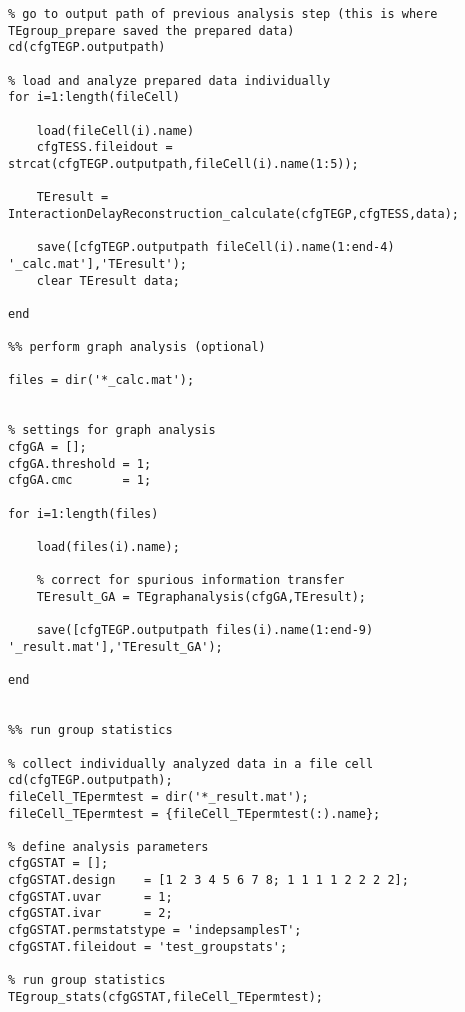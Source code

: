 \begin{lstlisting}
% go to output path of previous analysis step (this is where TEgroup_prepare saved the prepared data)
cd(cfgTEGP.outputpath)

% load and analyze prepared data individually
for i=1:length(fileCell)
        
    load(fileCell(i).name)
    cfgTESS.fileidout = strcat(cfgTEGP.outputpath,fileCell(i).name(1:5));
    
    TEresult = InteractionDelayReconstruction_calculate(cfgTEGP,cfgTESS,data);
    
    save([cfgTEGP.outputpath fileCell(i).name(1:end-4) '_calc.mat'],'TEresult');
    clear TEresult data;
    
end

%% perform graph analysis (optional)

files = dir('*_calc.mat');


% settings for graph analysis
cfgGA = [];
cfgGA.threshold = 1;
cfgGA.cmc       = 1;

for i=1:length(files)
    
    load(files(i).name);
    
    % correct for spurious information transfer
    TEresult_GA = TEgraphanalysis(cfgGA,TEresult);
    
    save([cfgTEGP.outputpath files(i).name(1:end-9) '_result.mat'],'TEresult_GA');
    
end


%% run group statistics

% collect individually analyzed data in a file cell
cd(cfgTEGP.outputpath);
fileCell_TEpermtest = dir('*_result.mat');
fileCell_TEpermtest = {fileCell_TEpermtest(:).name};

% define analysis parameters
cfgGSTAT = [];
cfgGSTAT.design    = [1 2 3 4 5 6 7 8; 1 1 1 1 2 2 2 2];
cfgGSTAT.uvar      = 1;
cfgGSTAT.ivar      = 2;
cfgGSTAT.permstatstype = 'indepsamplesT';
cfgGSTAT.fileidout = 'test_groupstats';

% run group statistics
TEgroup_stats(cfgGSTAT,fileCell_TEpermtest);
\end{lstlisting}
